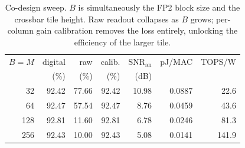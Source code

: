 \begin{table}[t]
\centering
\caption{Co-design sweep. $B$ is simultaneously the FP2 block size and the crossbar tile height. Raw readout collapses as $B$ grows; per-column gain calibration removes the loss entirely, unlocking the efficiency of the larger tile.}
\label{tab:codesign}
\begin{tabular}{rrrrrrr}
\toprule
$B{=}M$ & digital & raw & calib. & SNR$_{\mathrm{an}}$ & pJ/MAC & TOPS/W \\
 & (\%) & (\%) & (\%) & (dB) & & \\
\midrule
32 & 92.42 & 77.66 & 92.42 & 10.98 & 0.0887 & 22.6 \\
64 & 92.47 & 57.54 & 92.47 & 8.76 & 0.0459 & 43.6 \\
128 & 92.81 & 11.60 & 92.81 & 6.78 & 0.0246 & 81.3 \\
256 & 92.43 & 10.00 & 92.43 & 5.08 & 0.0141 & 141.9 \\
\bottomrule
\end{tabular}
\end{table}
